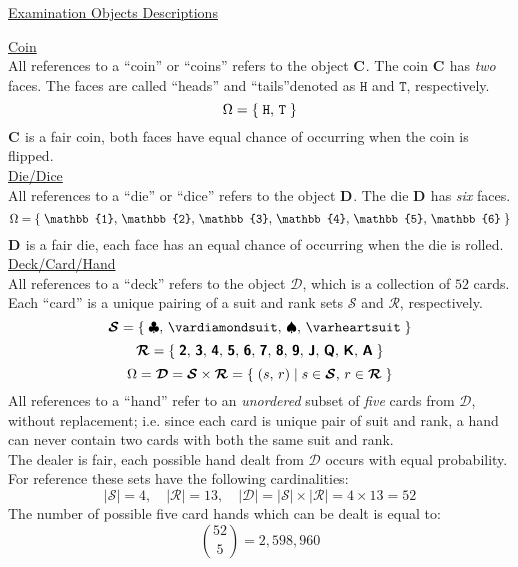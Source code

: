 \documentclass{ExamCUNY}
\newcommand{\Coin}[1]{\ensuremath{\mathbf{C}_{#1}}\xspace}
\newcommand{\Heads}{\ensuremath{\mathtt{H}}\xspace}
\newcommand{\Tails}{\ensuremath{\mathtt{T}}\xspace}
\newcommand{\Die}[1]{\ensuremath{\mathbf{D}_{#1}}\xspace}
\newcommand{\Num}[1]{\ensuremath{\mathbb{#1}}\xspace}
\newcommand{\Deck}{\ensuremath{\bm{\mathcal{D}}}\xspace}
\newcommand{\CardSuits}{\ensuremath{\bm{\mathcal{S}}}\xspace}
\newcommand{\CardRanks}{\ensuremath{\bm{\mathcal{R}}}\xspace}
\newcommand{\CardRank}[1]{\ensuremath{\text{\textsf{\textbf{#1}}}}\xspace}
\begin{document}
\newcommand{\ExamObject}[2]{%
{\huge \underline{#1}}\\[5mm]%
{\Large #2}\\[5mm]%
}


\clearpage%
%  
\begin{center}
{\Huge \underline{Examination Objects Descriptions}}
\end{center}

\ExamObject{Coin}{%
All references to a ``coin'' or ``coins'' refers to the object \Coin{}. The coin \Coin{} has \emph{two} faces.
The faces are called ``heads'' and ``tails''denoted as \Heads and \Tails, respectively.
\[\Omega = \SetNote{\Heads,\,\Tails}\]
\Coin{} is a fair coin, both faces have equal chance of occurring when the coin is flipped.
}

\ExamObject{Die/Dice}{%
All references to a ``die'' or ``dice'' refers to the object \Die{}. The die \Die{} has \emph{six} faces.
\[\Omega = \SetNote{\Num{1},\,\Num{2},\,\Num{3},\,\Num{4},\,\Num{5},\,\Num{6}}\]
\Die{} is a fair die, each face has an equal chance of occurring when the die is rolled.}


\ExamObject{Deck/Card/Hand}{
All references to a ``deck'' refers to the object \Deck, which is a collection of $52$ cards.
Each ``card'' is a unique pairing of a suit and rank sets \CardSuits and \CardRanks, respectively.
\[\CardSuits = 
\SetNote{
\clubsuit,\,
\vardiamondsuit,\,
\spadesuit,\, 
\varheartsuit
}\]
\[\CardRanks = \SetNote{
\CardRank{2},\,
\CardRank{3},\,
\CardRank{4},\,
\CardRank{5},\,
\CardRank{6},\,
\CardRank{7},\,
\CardRank{8},\,
\CardRank{9},\,
\CardRank{J},\,
\CardRank{Q},\,
\CardRank{K},\,
\CardRank{A}
}\]
\[\Omega = \Deck = \CardSuits \times \CardRanks = \SetNote{ (s,\,r)\;|\; s \in \CardSuits,\, r \in \CardRanks}\]
All references to a ``hand'' refer to an \emph{unordered} subset of \emph{five} cards from \Deck, without replacement; i.e. since each card is unique pair of suit and rank, a hand can never contain two cards with both the same suit and rank.\\[3mm]
The dealer is fair, each possible hand dealt from \Deck occurs with equal probability.\\[3mm]
For reference these sets have the following cardinalities:
\[ \left|\CardSuits\right| = 4,\quad\left|\CardRanks\right| = 13,\quad\left|\Deck\right| = \left|\CardSuits\right| \times \left|\CardRanks\right| = 4 \times 13 = 52 \]
The number of possible five card hands which can be dealt is equal to:
\[ \binom{52}{5} = 2,598,960 \]
}
\end{document}
